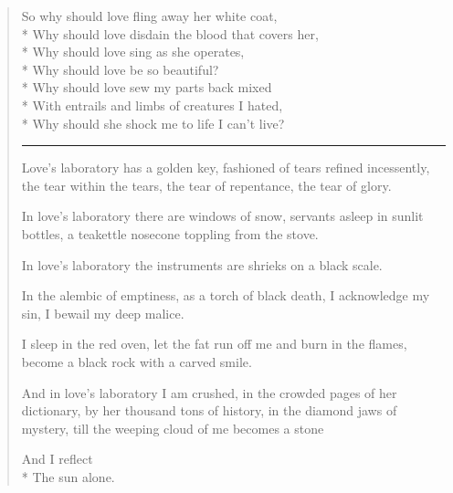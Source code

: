 \documentclass[english,11pt,letterpaper,onecolumn]{scrbook}
\begin{document}
\begin{verse}
So why should love fling away her white coat, \\*
Why should love disdain the blood that covers her, \\*
Why should love sing as she operates, \\*
Why should love be so beautiful? \\*
Why should love sew my parts back mixed \\*
With entrails and limbs of creatures I hated, \\*
Why should she shock me to life I can't live?


\begin{center}\rule[3pt]{2in}{0.5pt}\end{center}


Love's laboratory has a golden key, fashioned of tears refined incessently, the tear within the tears, the tear of repentance, the tear of glory.



In love's laboratory there are windows of snow, servants asleep in sunlit bottles, a teakettle nosecone toppling from the stove.



In love's laboratory the instruments are shrieks on a black scale.



In the alembic of emptiness, as a torch of black death, I acknowledge my sin, I bewail my deep malice.



I sleep in the red oven, let the fat run off me and burn in the flames, become a black rock with a carved smile.



And in love's laboratory I am crushed, in the crowded pages of her dictionary, by her thousand tons of history, in the diamond jaws of mystery, till the weeping cloud of me becomes a stone



And I reflect \\*
The sun alone.

\dictum{}
\end{verse}

\end{document}
